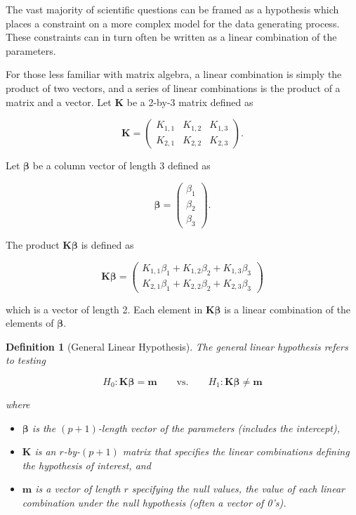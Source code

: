 \documentclass[
]{book}
\providecommand{\tightlist}{%
  \setlength{\itemsep}{0pt}\setlength{\parskip}{0pt}}
\theoremstyle{plain}
\theoremstyle{mydefn}
\newtheorem{definition}{Definition}[chapter]
\theoremstyle{myexmpl}
\theoremstyle{remark}
\begin{document}
The vast majority of scientific questions can be framed as a hypothesis which places a constraint on a more complex model for the data generating process. These constraints can in turn often be written as a linear combination of the parameters.

\begin{rmdtip}
For those less familiar with matrix algebra, a linear combination is simply the product of two vectors, and a series of linear combinations is the product of a matrix and a vector. Let \(\mathbf{K}\) be a 2-by-3 matrix defined as

\[\mathbf{K} = \begin{pmatrix} 
   K_{1,1} & K_{1,2} & K_{1,3} \\
   K_{2,1} & K_{2,2} & K_{2,3} \end{pmatrix}.\]

Let \(\boldsymbol{\beta}\) be a column vector of length 3 defined as

\[\boldsymbol{\beta} = \begin{pmatrix}
   \beta_1 \\
   \beta_2 \\
   \beta_3 \end{pmatrix}.\]

The product \(\mathbf{K} \boldsymbol{\beta}\) is defined as

\[\mathbf{K}\boldsymbol{\beta} = \begin{pmatrix}
   K_{1,1} \beta_1 + K_{1,2} \beta_2 + K_{1,3} \beta_3 \\
   K_{2,1} \beta_1 + K_{2,2} \beta_2 + K_{2,3} \beta_3 \end{pmatrix}\]

which is a vector of length 2. Each element in \(\mathbf{K}\boldsymbol{\beta}\) is a linear combination of the elements of \(\boldsymbol{\beta}\).
\end{rmdtip}

\begin{definition}[General Linear Hypothesis]

The general linear hypothesis refers to testing

\[H_0: \mathbf{K}\boldsymbol{\beta} = \mathbf{m} \qquad \text{vs.} \qquad H_1: \mathbf{K}\boldsymbol{\beta} \neq \mathbf{m}\]

where

\begin{itemize}
\tightlist
\item
  \(\boldsymbol{\beta}\) is the \((p+1)\)-length vector of the parameters (includes the intercept),
\item
  \(\mathbf{K}\) is an \(r\)-by-\((p+1)\) matrix that specifies the linear combinations defining the hypothesis of interest, and
\item
  \(\mathbf{m}\) is a vector of length \(r\) specifying the null values, the value of each linear combination under the null hypothesis (often a vector of 0's).
\end{itemize}

\end{definition}
\end{document}
